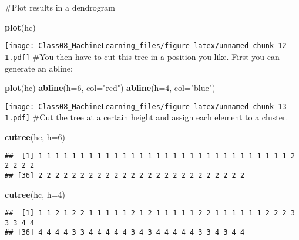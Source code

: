 \documentclass[]{article}
\newenvironment{Shaded}{\begin{snugshade}}{\end{snugshade}}
\newcommand{\DataTypeTok}[1]{\textcolor[rgb]{0.13,0.29,0.53}{#1}}
\newcommand{\DecValTok}[1]{\textcolor[rgb]{0.00,0.00,0.81}{#1}}
\newcommand{\KeywordTok}[1]{\textcolor[rgb]{0.13,0.29,0.53}{\textbf{#1}}}
\newcommand{\NormalTok}[1]{#1}
\newcommand{\StringTok}[1]{\textcolor[rgb]{0.31,0.60,0.02}{#1}}
\begin{document}
\#Plot results in a dendrogram

\begin{Shaded}
\begin{Highlighting}[]
\KeywordTok{plot}\NormalTok{(hc)}
\end{Highlighting}
\end{Shaded}

\texttt{[image: Class08\_MachineLearning\_files/figure-latex/unnamed-chunk-12-1.pdf]}
\#You then have to cut this tree in a position you like. First you can
generate an abline:

\begin{Shaded}
\begin{Highlighting}[]
\KeywordTok{plot}\NormalTok{(hc)}
\KeywordTok{abline}\NormalTok{(}\DataTypeTok{h=}\DecValTok{6}\NormalTok{, }\DataTypeTok{col=}\StringTok{"red"}\NormalTok{)}
\KeywordTok{abline}\NormalTok{(}\DataTypeTok{h=}\DecValTok{4}\NormalTok{, }\DataTypeTok{col=}\StringTok{"blue"}\NormalTok{)}
\end{Highlighting}
\end{Shaded}

\texttt{[image: Class08\_MachineLearning\_files/figure-latex/unnamed-chunk-13-1.pdf]}
\#Cut the tree at a certain height and assign each element to a cluster.

\begin{Shaded}
\begin{Highlighting}[]
\KeywordTok{cutree}\NormalTok{(hc, }\DataTypeTok{h=}\DecValTok{6}\NormalTok{)}
\end{Highlighting}
\end{Shaded}

\begin{verbatim}
##  [1] 1 1 1 1 1 1 1 1 1 1 1 1 1 1 1 1 1 1 1 1 1 1 1 1 1 1 1 1 1 1 2 2 2 2 2
## [36] 2 2 2 2 2 2 2 2 2 2 2 2 2 2 2 2 2 2 2 2 2 2 2 2 2
\end{verbatim}

\begin{Shaded}
\begin{Highlighting}[]
\KeywordTok{cutree}\NormalTok{(hc, }\DataTypeTok{h=}\DecValTok{4}\NormalTok{)}
\end{Highlighting}
\end{Shaded}

\begin{verbatim}
##  [1] 1 1 2 1 2 2 1 1 1 1 1 2 1 2 1 1 1 1 1 2 2 1 1 1 1 1 1 2 2 2 3 3 3 4 4
## [36] 4 4 4 4 3 3 4 4 4 4 4 3 4 3 4 4 4 4 4 3 3 4 3 4 4
\end{verbatim}
\end{document}
